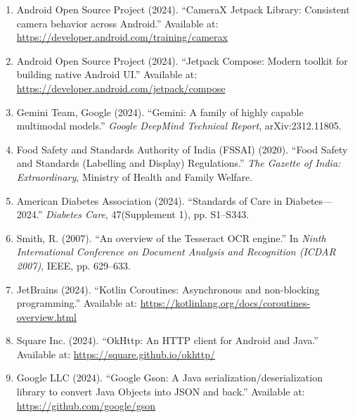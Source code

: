 \documentclass[12pt]{article}
\begin{document}
\begin{enumerate}
    \vspace{0.2cm}
    \item Android Open Source Project (2024). ``CameraX Jetpack Library: Consistent camera behavior across Android.'' Available at: \url{https://developer.android.com/training/camerax}
    
    \vspace{0.2cm}
    \item Android Open Source Project (2024). ``Jetpack Compose: Modern toolkit for building native Android UI.'' Available at: \url{https://developer.android.com/jetpack/compose}
    
    \vspace{0.2cm}
    \item Gemini Team, Google (2024). ``Gemini: A family of highly capable multimodal models.'' \textit{Google DeepMind Technical Report}, arXiv:2312.11805.
    
    \vspace{0.2cm}
    \item Food Safety and Standards Authority of India (FSSAI) (2020). ``Food Safety and Standards (Labelling and Display) Regulations.'' \textit{The Gazette of India: Extraordinary}, Ministry of Health and Family Welfare.
    
    \vspace{0.2cm}
    \item American Diabetes Association (2024). ``Standards of Care in Diabetes---2024.'' \textit{Diabetes Care}, 47(Supplement 1), pp. S1--S343.
    
    \vspace{0.2cm}
    \item Smith, R. (2007). ``An overview of the Tesseract OCR engine.'' In \textit{Ninth International Conference on Document Analysis and Recognition (ICDAR 2007)}, IEEE, pp. 629--633.
    
    \vspace{0.2cm}
    \item JetBrains (2024). ``Kotlin Coroutines: Asynchronous and non-blocking programming.'' Available at: \url{https://kotlinlang.org/docs/coroutines-overview.html}
    
    \vspace{0.2cm}
    \item Square Inc. (2024). ``OkHttp: An HTTP client for Android and Java.'' Available at: \url{https://square.github.io/okhttp/}
    
    \vspace{0.2cm}
    \item Google LLC (2024). ``Google Gson: A Java serialization/deserialization library to convert Java Objects into JSON and back.'' Available at: \url{https://github.com/google/gson}
    

\end{enumerate}
\end{document}
